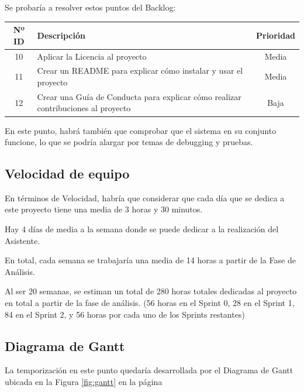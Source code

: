 Se probaría a resolver estos puntos del Backlog:
\begin{table}[H]
	\begin{tabularx}{\textwidth}{|c|X|c|}
		\hline
		\textbf{Nº ID} & \textbf{Descripción} & \textbf{Prioridad} \\
		\hline
		10 &  Aplicar la Licencia al proyecto & Media \\
		\hline
		11 & Crear un README para explicar cómo instalar y usar el proyecto & Media \\
		\hline
		12 & Crear una Guía de Conducta para explicar cómo realizar contribuciones al proyecto & Baja \\
		\hline
	\end{tabularx}
\end{table}

En este punto, habrá también que comprobar que el sistema en su conjunto funcione, lo que se podría alargar por temas de debugging y pruebas.

\subsection{Velocidad de equipo}
En términos de Velocidad, habría que considerar que cada día que se dedica a este proyecto tiene una media de 3 horas y 30 minutos.

Hay 4 días de media a la semana donde se puede dedicar a la realización del Asistente. 

En total, cada semana se trabajaría una media de 14 horas a partir de la Fase de Análisis.

Al ser 20 semanas, se estiman un total de 280 horas totales dedicadas al proyecto en total a partir de la fase de análisis. (56 horas en el Sprint 0, 28 en el Sprint 1, 84 en el Sprint 2, y 56 horas por cada uno de los Sprints restantes)

\subsection{Diagrama de Gantt}
La temporización en este punto quedaría desarrollada por el Diagrama de Gantt ubicada en la Figura \ref{fig:gantt} en la página \pageref{fig:gantt}

